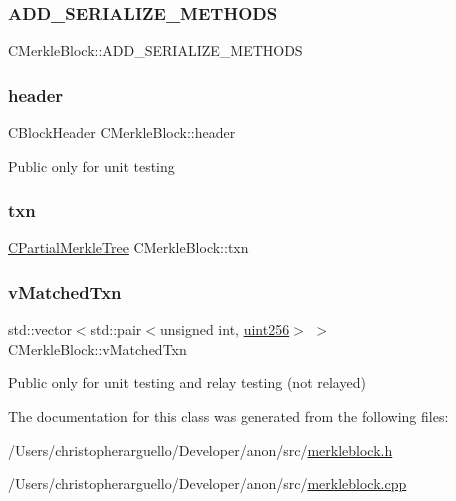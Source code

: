 \subsubsection{\texorpdfstring{A\+D\+D\+\_\+\+S\+E\+R\+I\+A\+L\+I\+Z\+E\+\_\+\+M\+E\+T\+H\+O\+DS}{ADD\_SERIALIZE\_METHODS}}
{\footnotesize\ttfamily C\+Merkle\+Block\+::\+A\+D\+D\+\_\+\+S\+E\+R\+I\+A\+L\+I\+Z\+E\+\_\+\+M\+E\+T\+H\+O\+DS}

\mbox{\label{class_c_merkle_block_a3c1fcef77eee1b476b3f3fd52055748a}} 
\subsubsection{\texorpdfstring{header}{header}}
{\footnotesize\ttfamily C\+Block\+Header C\+Merkle\+Block\+::header}

Public only for unit testing \mbox{\label{class_c_merkle_block_ac2174e9e8ea6e429328deb5a69a05558}} 
\subsubsection{\texorpdfstring{txn}{txn}}
{\footnotesize\ttfamily \mbox{\hyperlink{class_c_partial_merkle_tree}{C\+Partial\+Merkle\+Tree}} C\+Merkle\+Block\+::txn}

\mbox{\label{class_c_merkle_block_a73bbbdcb5d83588b15461c02d0228999}} 
\subsubsection{\texorpdfstring{v\+Matched\+Txn}{vMatchedTxn}}
{\footnotesize\ttfamily std\+::vector$<$std\+::pair$<$unsigned int, \mbox{\hyperlink{classuint256}{uint256}}$>$ $>$ C\+Merkle\+Block\+::v\+Matched\+Txn}

Public only for unit testing and relay testing (not relayed) 

The documentation for this class was generated from the following files\+:\begin{DoxyCompactItemize}
\item 
/\+Users/christopherarguello/\+Developer/anon/src/\mbox{\hyperlink{merkleblock_8h}{merkleblock.\+h}}\item 
/\+Users/christopherarguello/\+Developer/anon/src/\mbox{\hyperlink{merkleblock_8cpp}{merkleblock.\+cpp}}\end{DoxyCompactItemize}
